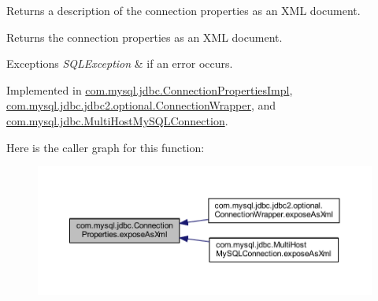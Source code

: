 Returns a description of the connection properties as an X\+ML document.

\begin{DoxyReturn}{Returns}
the connection properties as an X\+ML document. 
\end{DoxyReturn}

\begin{DoxyExceptions}{Exceptions}
{\em S\+Q\+L\+Exception} & if an error occurs. \\
\hline
\end{DoxyExceptions}


Implemented in \mbox{\hyperlink{classcom_1_1mysql_1_1jdbc_1_1_connection_properties_impl_a1f5d852e50bec0d2947c724c9a33f8ee}{com.\+mysql.\+jdbc.\+Connection\+Properties\+Impl}}, \mbox{\hyperlink{classcom_1_1mysql_1_1jdbc_1_1jdbc2_1_1optional_1_1_connection_wrapper_ac3ce990dbc68f651981e2fddf73e9df8}{com.\+mysql.\+jdbc.\+jdbc2.\+optional.\+Connection\+Wrapper}}, and \mbox{\hyperlink{classcom_1_1mysql_1_1jdbc_1_1_multi_host_my_s_q_l_connection_acaae1022ce53ec5e0ba07c1a90244af2}{com.\+mysql.\+jdbc.\+Multi\+Host\+My\+S\+Q\+L\+Connection}}.

Here is the caller graph for this function\+:\nopagebreak
\begin{figure}[H]
\begin{center}
\leavevmode
\includegraphics[width=350pt]{interfacecom_1_1mysql_1_1jdbc_1_1_connection_properties_a73482b2a70021a34f84dbc38bf1a105a_icgraph}
\end{center}
\end{figure}
\mbox{\label{interfacecom_1_1mysql_1_1jdbc_1_1_connection_properties_a2da790a00e98b06833dc0856c42d638a}} 
